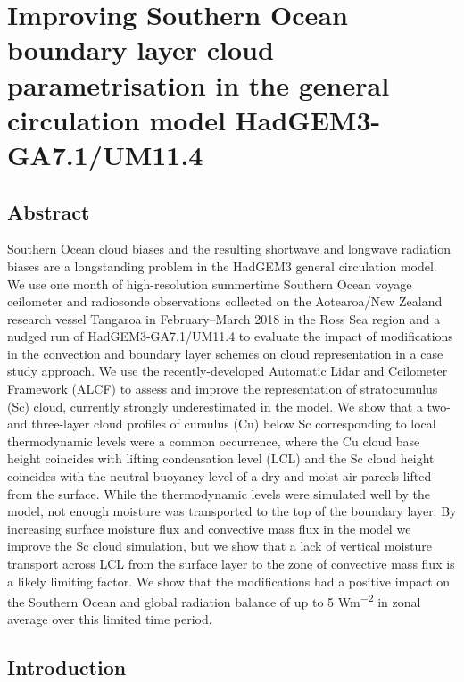 \chapter{Improving Southern Ocean boundary layer cloud para\-metrisation in the general circulation model HadGEM3-GA7.1/UM11.4}

\section*{Abstract}

Southern Ocean cloud biases and the resulting shortwave and longwave radiation
biases are a longstanding problem in the HadGEM3 general circulation model. We use one month of high-resolution summertime
Southern Ocean voyage ceilometer and radiosonde observations collected on the Aotearoa/New Zealand research vessel Tangaroa in February--March
2018 in the Ross Sea region
and a nudged run of HadGEM3-GA7.1/UM11.4 to
evaluate the impact of modifications in the convection and boundary layer
schemes on cloud representation in a case study approach. We use the recently-developed Automatic Lidar and Ceilometer Framework (ALCF) to assess and improve the representation of stratocumulus (Sc) cloud,
currently strongly underestimated in the model. We show that a two- and three-layer cloud
profiles of cumulus (Cu) below Sc corresponding to local thermodynamic levels were a common occurrence, where
the Cu cloud base height coincides with lifting condensation level (LCL)
and the Sc cloud height coincides with the neutral buoyancy level of a dry and moist air
parcels lifted from the surface. While the thermodynamic levels were simulated
well by the model, not enough moisture was transported to the top of the boundary layer.
By increasing surface moisture flux and convective mass flux in the model we improve the
Sc cloud simulation, but we show that a lack of vertical moisture transport
across LCL from the surface layer to the zone of convective mass flux is a likely limiting factor.
We show that the modifications had a positive impact on the Southern Ocean and
global radiation balance of up to 5 \unit{Wm^{-2}} in zonal average over this limited time period.

\section{Introduction}

